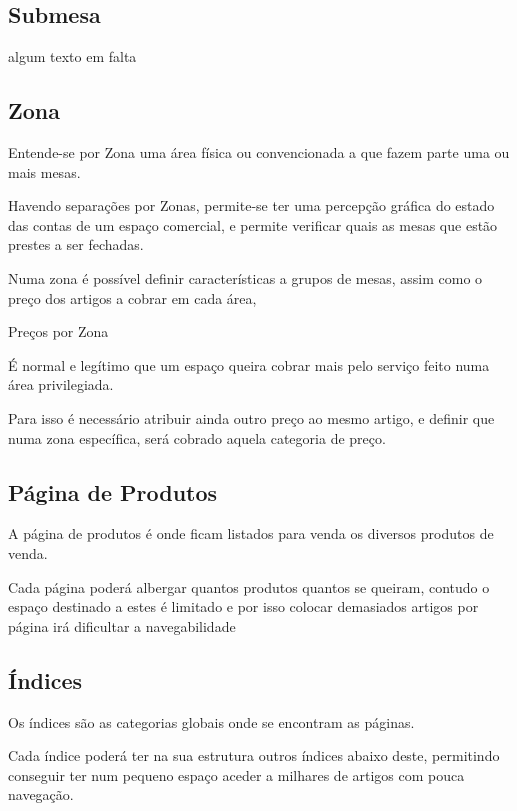 \documentclass[a4paper,11pt,openany]{memoir}
\newcommand\dica{\texttt{[image: ../small-n-flat-master/png/96/light-bulb.png]}}
\newcommand{\bcdica}[2]{\vspace{5mm}\begin{bclogo}[couleur=blue!30,logo=\dica]{\hspace{0.7cm}#1}{#2}\end{bclogo}}
\begin{document}
\subsection{Submesa}

\begin{HUGE}
algum texto em falta
\end{HUGE}



\subsection{Zona}

Entende-se por Zona uma área física ou convencionada a que fazem parte uma ou mais mesas. 

Havendo separações por Zonas, permite-se ter uma percepção gráfica do estado das 
contas de um espaço comercial, e permite verificar quais as mesas que estão prestes a ser
fechadas.

Numa zona é possível definir características a grupos de mesas, assim como o preço dos artigos a cobrar em cada área,

\bcdica{Preços por Zona}{
É normal e legítimo que um espaço queira cobrar mais pelo serviço feito numa área privilegiada.

Para isso é necessário atribuir ainda outro preço ao mesmo artigo, e definir que numa zona específica,
será cobrado aquela categoria de preço. 
}
 

\subsection{Página de Produtos}

A página de produtos é onde ficam listados para venda os diversos produtos de venda.

Cada página poderá albergar quantos produtos quantos se queiram, contudo o espaço destinado a estes é 
limitado e por isso colocar demasiados artigos por página irá dificultar a navegabilidade


\subsection{Índices}

Os índices são as categorias globais onde se encontram as páginas. 

Cada índice poderá ter na sua estrutura outros índices abaixo deste, permitindo conseguir ter num pequeno
espaço aceder a milhares de artigos com pouca navegação.
\end{document}
